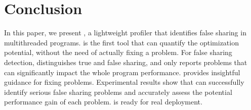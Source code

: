 \section{Conclusion}
\label{sec:conclusion}

In this paper, we present \cheetah{}, a lightweight profiler that identifies false sharing in multithreaded programs. \cheetah{} is the first tool that can quantify the optimization potential, without the need of actually fixing a problem. For false sharing detection, \cheetah{} distinguishes true and false sharing, and only reports problems that can significantly impact the whole program performance. \cheetah{} provides insightful guidance for fixing problems. Experimental results show that \cheetah{} can successfully identify serious false sharing problems and accurately assess the potential performance gain of each problem. \Cheetah{} is ready for real deployment.



